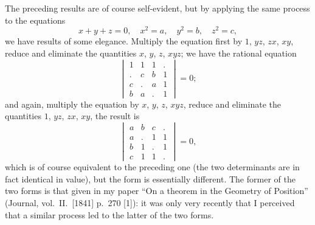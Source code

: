 \documentclass[11pt,a4paper]{article}
\theoremstyle{plain}
\begin{document}
The preceding results are of course self-evident, but by applying the same process to the equations
\[x + y + z = 0, \quad x^2 = a, \quad y^2 = b, \quad z^2 = c,\]
we have results of some elegance. Multiply the equation first by $1$, $yz$, $zx$, $xy$, reduce and eliminate the quantities $x$, $y$, $z$, $xyz$; we have the rational equation
\[\begin{vmatrix} 1 & 1 & 1 & . \\ . & c & b & 1 \\ c & . & a & 1 \\ b & a & . & 1 \end{vmatrix} = 0;\]
and again, multiply the equation by $x$, $y$, $z$, $xyz$, reduce and eliminate the quantities $1$, $yz$, $zx$, $xy$, the result is
\[\begin{vmatrix} a & b & c & . \\ a & . & 1 & 1 \\ b & 1 & . & 1 \\ c & 1 & 1 & . \end{vmatrix} = 0,\]
which is of course equivalent to the preceding one (the two determinants are in fact identical in value), but the form is essentially different. The former of the two forms is that given in my paper ``On a theorem in the Geometry of Position'' (Journal, vol.\ II.\ [1841] p.\ 270 [1]): it was only very recently that I perceived that a similar process led to the latter of the two forms.
\end{document}
